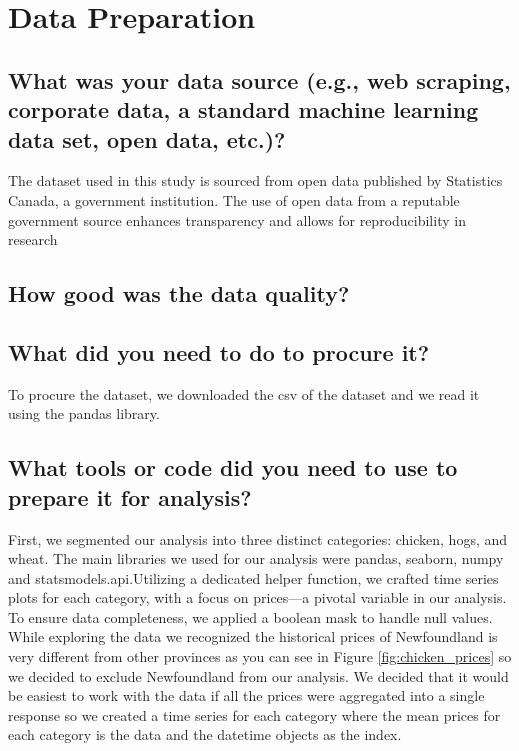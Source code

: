 \section{Data Preparation}

\subsection{What was your data source (e.g., web scraping, corporate data, a standard machine learning data set, open data, etc.)?}

The dataset used in this study is sourced from open data published by Statistics Canada, a government institution. The use of open data from a reputable government source enhances transparency and allows for reproducibility in research

\subsection{How good was the data quality?}



\subsection{What did you need to do to procure it?}

To procure the dataset, we downloaded the csv of the dataset and we read it using the pandas library. 

\subsection{What tools or code did you need to use to prepare it for analysis?}

First, we segmented our analysis into three distinct categories: chicken, hogs, and wheat. The main libraries we used for our analysis were pandas, seaborn, numpy and statsmodels.api.Utilizing a dedicated helper function, we crafted time series plots for each category, with a focus on prices—a pivotal variable in our analysis. To ensure data completeness, we applied a boolean mask to handle null values. While exploring the data we recognized the historical prices of Newfoundland is very different from other provinces as you can see in Figure \ref{fig:chicken_prices} so we decided to exclude Newfoundland from our analysis. We decided that it would be easiest to work with the data if all the prices were aggregated into a single response so we created a time series for each category where the mean prices for each category is the data and the datetime objects as the index. 

